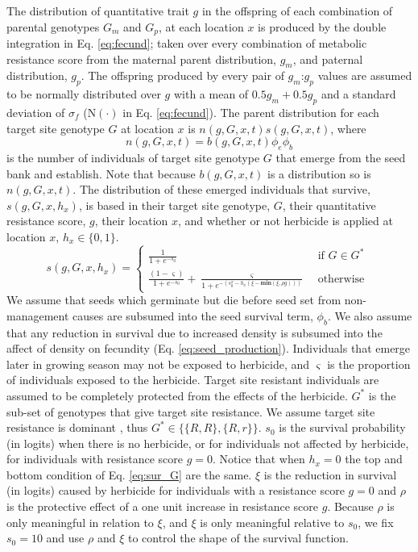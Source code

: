\documentclass[10pt,letterpaper]{article}
\begin{document}
The distribution of quantitative trait $g$ in the offspring of each combination of parental genotypes $G_m$ and $G_p$, at each location $x$ is produced by the double integration in Eq. \ref{eq:fecund}; taken over every combination of metabolic resistance score from the maternal parent distribution, $g_m$, and paternal distribution, $g_p$. The offspring produced by every pair of $g_m$:$g_p$ values are assumed to be normally distributed over $g$ with a mean of $0.5g_m + 0.5g_p$ and a standard deviation of $\sigma_f$ ($\text{N}(\cdot)$ in Eq. \ref{eq:fecund}). The parent distribution for each target site genotype $G$ at location $x$ is $n(g, G, x, t)s(g, G, x, t)$, where 
\begin{equation}\label{eq:above_ground}
	n(g, G, x, t) = b(g, G, x, t)\phi_e\phi_b
\end{equation}
is the number of individuals of target site genotype $G$ that emerge from the seed bank and establish. Note that because $b(g, G, x, t)$ is a distribution so is $n(g, G, x, t)$. The distribution of these emerged individuals that survive, $s(g, G, x, h_x)$, is based in their target site genotype, $G$, their quantitative resistance score, $g$, their location $x$, and whether or not herbicide is applied at location $x$, $h_x \in \{0, 1\}$.   
\begin{equation}\label{eq:sur_G}
	s(g, G, x, h_x) = \begin{cases} 
		\frac{1}{1 + e^{-s_0}} &\text{~if~} G \in G^* \\
		\frac{(1 - \varsigma)}{1 + e^{-s_0}} + \frac{\varsigma}{1 + e^{-\left(s_0^x - h_x\left(\xi - \textbf{min}(\xi, \rho g) \right)\right)}} &\text{~otherwise~} 		
	\end{cases} 
\end{equation}
We assume that seeds which germinate but die before seed set from non-management causes are subsumed into the seed survival term, $\phi_b$. We also assume that any reduction in survival due to increased density is subsumed into the affect of density on fecundity (Eq. \ref{eq:seed_production}). Individuals that emerge later in growing season may not be exposed to herbicide, and $\varsigma$ is the proportion of individuals exposed to the herbicide. Target site resistant individuals are assumed to be completely protected from the effects of the herbicide. $G^*$ is the sub-set of genotypes that give target site resistance. We assume target site resistance is dominant \cite{Neve2007}, thus $G^* \in \{\{R, R\}, \{R, r\}\}$. $s_0$ is the survival probability (in logits) when there is no herbicide, or for individuals not affected by herbicide, for individuals with resistance score $g = 0$. Notice that when $h_x = 0$ the top and bottom condition of Eq. \ref{eq:sur_G} are the same. $\xi$ is the reduction in survival (in logits) caused by herbicide for individuals with a resistance score $g = 0$ and $\rho$ is the protective effect of a one unit increase in resistance score $g$. Because $\rho$ is only meaningful in relation to $\xi$, and $\xi$ is only meaningful relative to $s_0$, we fix $s_0 = 10$ and use $\rho$ and $\xi$ to control the shape of the survival function. 
\end{document}
